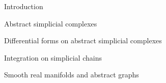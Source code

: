 \documentclass[12pt,a4paper]{report}
\begin{document}
\tableofcontents


\begin{chapter}{Introduction}
    \begin{section}{Abstract simplicial complexes}
    \end{section}
    \begin{section}{Differential forms on abstract simplicial complexes}
    \end{section}
    \begin{section}{Integration on simplicial chains}
    \end{section}
    \begin{section}{Smooth real manifolds and abstract graphs}
    \end{section}
\end{chapter}
\end{document}

